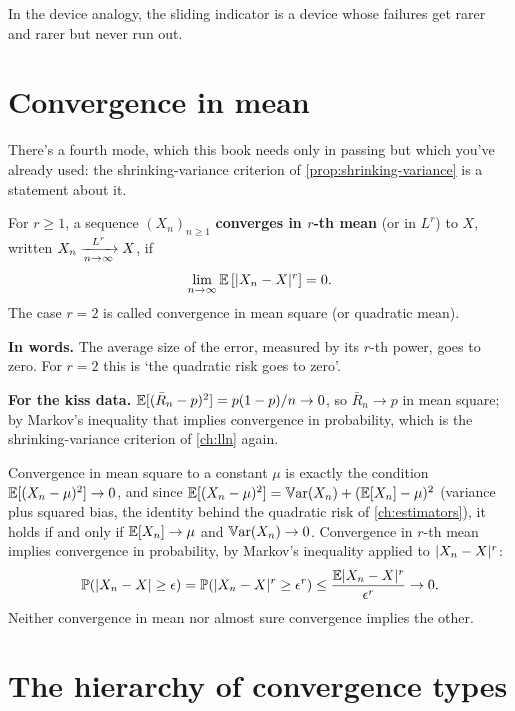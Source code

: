 In the device analogy, the sliding indicator is a device whose failures get rarer and rarer but never run out.

\section{Convergence in mean}
\label{sec:conv-mean}

There's a fourth mode, which this book needs only in passing but which you've already used: the shrinking-variance criterion of \cref{prop:shrinking-variance} is a statement about it.

\begin{definition}
\label{def:convr}
For $r \geq 1$, a sequence $(X_n)_{n \geq 1}$ \textbf{converges in $r$-th mean} (or in $L^r$) to $X$, written $X_n \xrightarrow [n \to \infty ]{L^{r}} X$, if
\[
\lim_{n \to \infty} \operatorname*{\mathbb{E}} \left[ \lvert X_n - X\rvert^r \right] = 0.
\]
The case $r = 2$ is called convergence in mean square (or quadratic mean).
\end{definition}

\begin{inwords}
\textbf{In words.} The average size of the error, measured by its $r$-th power, goes to zero. For $r = 2$ this is `the quadratic risk goes to zero'.
\par\smallskip
\textbf{For the kiss data.} $\operatorname*{\mathbb{E}}[(\bar{R}_n - p)^2] = p(1-p)/n \to 0$, so $\bar{R}_n \to p$ in mean square; by Markov's inequality  that implies convergence in probability, which is the shrinking-variance criterion of \cref{ch:lln} again.
\end{inwords}

Convergence in mean square to a constant $\mu$ is exactly the condition $\operatorname*{\mathbb{E}}[(X_n - \mu)^2] \to 0$, and since $\operatorname*{\mathbb{E}}[(X_n - \mu)^2] = \operatorname*{\mathbb{V}\text{ar}}(X_n) + (\operatorname*{\mathbb{E}}[X_n] - \mu)^2$ (variance plus squared bias, the identity behind the quadratic risk of \cref{ch:estimators}), it holds if and only if $\operatorname*{\mathbb{E}}[X_n] \to \mu$ and $\operatorname*{\mathbb{V}\text{ar}}(X_n) \to 0$.
Convergence in $r$-th mean implies convergence in probability, by Markov's inequality applied to $\lvert X_n - X\rvert^r$:
\[
\mathbb{P}(\lvert X_n - X\rvert \geq \epsilon) = \mathbb{P}(\lvert X_n - X\rvert^r \geq \epsilon^r) \leq \frac{\operatorname*{\mathbb{E}} \lvert X_n - X\rvert^r}{\epsilon^r} \to 0.
\]
Neither convergence in mean nor almost sure convergence implies the other.

\section{The hierarchy of convergence types}
\label{sec:conv-hierarchy}

